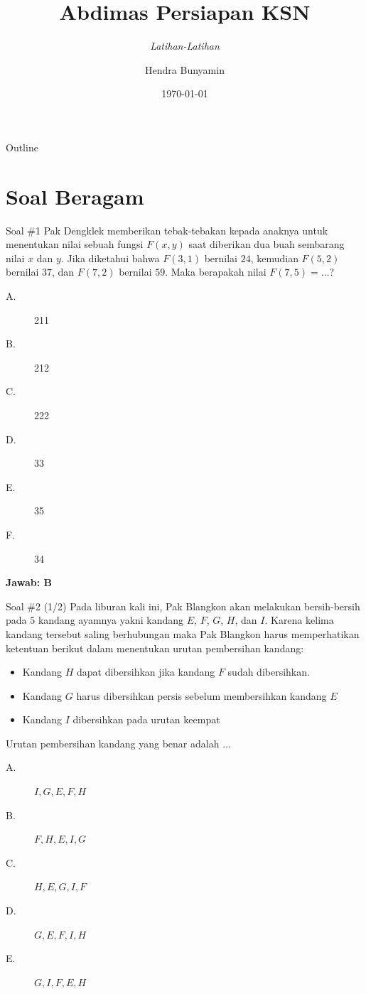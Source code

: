 \documentclass[english,t]{beamer}
\title[]
{\textbf{Abdimas Persiapan KSN}}
\subtitle
{\textit{Latihan-Latihan}\\ \citep{ppn2020soalksnk}}
\author{Hendra Bunyamin}
\date[NUNI IT Online] %
{\today}
\begin{document}
 
	
	\begin{frame}
		\titlepage
	\end{frame}
	
	\begin{frame}{Outline}
		\tableofcontents
	\end{frame}
	
	\section{Soal Beragam} 
	\begin{frame}{Soal \#1} 
		Pak Dengklek memberikan tebak-tebakan kepada anaknya untuk menentukan nilai sebuah fungsi $F(x, y)$ saat diberikan dua buah sembarang nilai $x$ dan $y$. Jika diketahui bahwa $F(3, 1)$ bernilai $24$, kemudian $F(5,2)$ bernilai $37$, dan $F(7, 2)$ bernilai $59$. Maka berapakah nilai $F(7, 5) = \ldots$? 
		\begin{description}
		\item[A.] 211
		\item[B.] 212
		\item[C.] 222
		\item[D.] 33
		\item[E.] 35
		\item[F.] 34
		\end{description}
		\pause \textbf{Jawab: B}
	\end{frame}
	
	\begin{frame}{Soal \#2 (1/2)} 
		Pada liburan kali ini, Pak Blangkon akan melakukan bersih-bersih pada $5$ kandang ayamnya yakni kandang $E$, $F$, $G$, $H$, dan $I$. Karena kelima kandang tersebut saling berhubungan maka Pak Blangkon harus memperhatikan ketentuan berikut dalam menentukan urutan pembersihan kandang:
		\begin{itemize}
			\item Kandang $H$ dapat dibersihkan jika kandang $F$ sudah dibersihkan.
			\item Kandang $G$ harus dibersihkan persis sebelum membersihkan kandang $E$
			\item Kandang $I$ dibersihkan pada urutan keempat
		\end{itemize}		
		Urutan pembersihan kandang yang benar adalah $\ldots$
		\begin{description}
			\item[A.] $I, G, E, F, H$
			\item[B.] $F, H, E, I, G$
			\item[C.] $H, E, G, I, F$
			\item[D.] $G, E, F, I, H$
			\item[E.] $G, I, F, E, H$
		\end{description}
	\end{frame}
\end{document}
